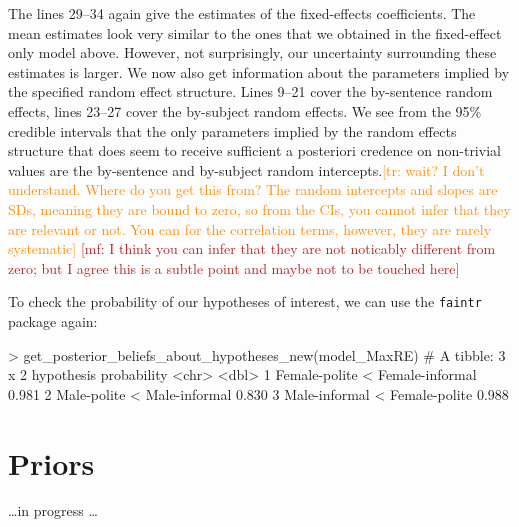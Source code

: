 \documentclass[nobib]{tufte-handout}
\renewcommand{\mf}[1]{\textcolor{firebrick}{[mf: #1]}}
\newcommand{\tr}[1]{\textcolor{DarkOrange}{[tr: #1]}}
\begin{document}
The lines 29--34 again give the estimates of the fixed-effects coefficients. The mean estimates look very similar to the ones that we obtained in the fixed-effect only model above. However, not surprisingly, our uncertainty surrounding these estimates is larger.  
We now also get information about the parameters implied by the specified random effect
structure. Lines 9--21 cover the by-sentence random effects, lines 23--27 cover the by-subject
random effects. We see from the 95\% credible intervals that the only parameters implied by the
random effects structure that does seem to receive sufficient a posteriori credence on
non-trivial values are the by-sentence and by-subject random intercepts.\tr{wait? I don't
  understand. Where do you get this from? The random intercepts and slopes are SDs, meaning
  they are bound to zero, so from the CIs, you cannot infer that they are relevant or not. You
  can for the correlation terms, however, they are rarely systematic} \mf{I think you can infer
that they are not noticably different from zero; but I agree this is a subtle point and maybe
not to be touched here}

To check the probability of our hypotheses of interest, we can use the \texttt{faintr} package again:

\medskip

\begin{minipage}[]{\textwidth}
\begin{rc}
> get_posterior_beliefs_about_hypotheses_new(model_MaxRE)
# A tibble: 3 x 2
  hypothesis                      probability
  <chr>                                 <dbl>
1 Female-polite < Female-informal       0.981
2 Male-polite < Male-informal           0.830
3 Male-informal < Female-polite         0.988
\end{rc}
\end{minipage}
\section{Priors}

\dots in progress \dots





\end{document}
